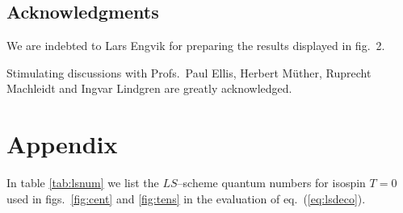 \subsection*{Acknowledgments}
We are indebted to Lars Engvik for preparing the results displayed in fig.\ 2.

Stimulating
discussions with Profs.\ Paul Ellis,
Herbert M\"{u}ther, Ruprecht Machleidt and Ingvar Lindgren are greatly
acknowledged.

\clearpage
\section*{Appendix}
In table \ref{tab:lsnum} we list the $LS$--scheme
quantum numbers for isospin $T=0$ used in figs.\ \ref{fig:cent} and
\ref{fig:tens} in the evaluation of eq.\ (\ref{eq:lsdeco}).






